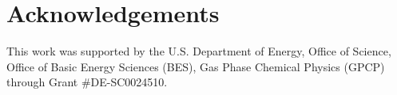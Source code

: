 \documentclass[final, letterpaper, square, comma, numbers, sort&compress]{elsarticle}
\begin{document}
\section*{Acknowledgements}
This work was supported by the U.S. Department of Energy, Office of Science, Office of Basic Energy Sciences (BES), Gas Phase Chemical Physics (GPCP) through Grant \#DE-SC0024510.



\end{document}
